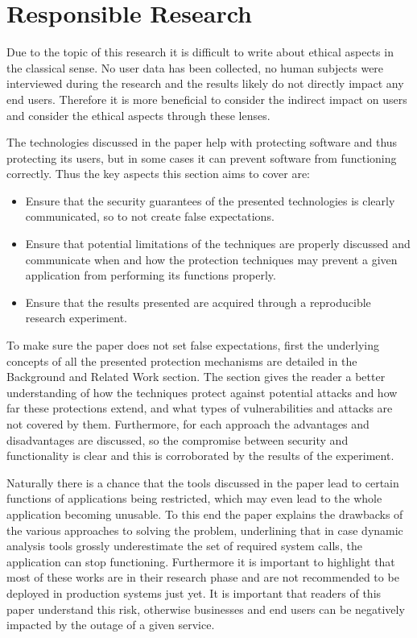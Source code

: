 \section{Responsible Research}
\label{sec:responsible}
Due to the topic of this research it is difficult to write about ethical aspects in the classical sense. No user data has been collected, no human subjects were interviewed during the research and the results likely do not directly impact any end users.
Therefore it is more beneficial to consider the indirect impact on users and consider the ethical aspects through these lenses.

The technologies discussed in the paper help with protecting software and thus protecting its users, but in some cases it can prevent software from functioning correctly.
Thus the key aspects this section aims to cover are:
\begin{itemize}
    \item Ensure that the security guarantees of the presented technologies is clearly communicated, so to not create false expectations.
    \item Ensure that potential limitations of the techniques are properly discussed and communicate when and how the protection techniques may prevent a given application from performing its functions properly.
    \item Ensure that the results presented are acquired through a reproducible research experiment.
\end{itemize}

To make sure the paper does not set false expectations, first the underlying concepts of all the presented protection mechanisms are detailed in the Background and Related Work section.
The section gives the reader a better understanding of how the techniques protect against potential attacks and how far these protections extend, and what types of vulnerabilities and attacks are not covered by them.
Furthermore, for each approach the advantages and disadvantages are discussed, so the compromise between security and functionality is clear and this is corroborated by the results of the experiment.

Naturally there is a chance that the tools discussed in the paper lead to certain functions of applications being restricted, which may even lead to the whole application becoming unusable.
To this end the paper explains the drawbacks of the various approaches to solving the problem, underlining that in case dynamic analysis tools grossly underestimate the set of required system calls, the application can stop functioning. Furthermore it is important to highlight that most of these works are in their research phase and are not recommended to be deployed in production systems just yet.
It is important that readers of this paper understand this risk, otherwise businesses and end users can be negatively impacted by the outage of a given service.

